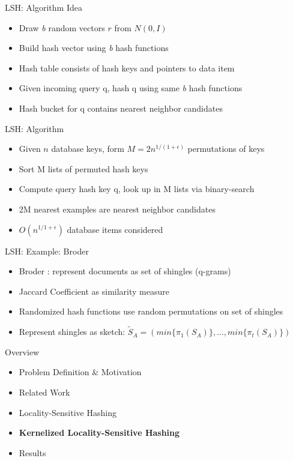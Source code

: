 \documentclass[12pt,a4paper]{beamer}
\begin{document}
\begin{frame}{LSH: Algorithm Idea}
\begin{itemize}
\item Draw \textit{b} random vectors $r$ from $N(0,I)$
\item Build hash vector using \textit{b} hash functions
\item Hash table consists of hash keys and pointers to data item
\item Given incoming query q, hash q using same \textit{b} hash functions
\item Hash bucket for q contains nearest neighbor candidates
\end{itemize}
\end{frame}

\begin{frame}{LSH: Algorithm}
\begin{itemize}
\item Given $n$ database keys, form $M=2n^{1/(1+\epsilon)}$ permutations of keys
\item Sort M lists of permuted hash keys
\item Compute query hash key q, look up in M lists via binary-search
\item 2M nearest examples are nearest neighbor candidates
\item $O(n^{1/1+\epsilon})$ database items considered
\end{itemize}
\end{frame}

\begin{frame}{LSH: Example: Broder}
\begin{itemize}
\item Broder \cite{broder}: represent documents as set of shingles (q-grams)
\item Jaccard Coefficient as similarity measure
\item Randomized hash functions use random permutations on set of shingles
\item Represent shingles as sketch: $\tilde S_{A} = (min\{\pi_{1}(S_{A})\},..., min\{\pi_{t}(S_{A})\})$
\end{itemize}
\end{frame}

\begin{frame}{Overview}
\begin{itemize}
\item Problem Definition \& Motivation
\item Related Work
\item Locality-Sensitive Hashing
\item \textbf{Kernelized Locality-Sensitive Hashing}
\item Results
\end{itemize}
\end{frame}
\end{document}
